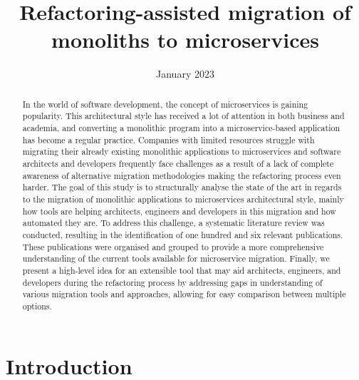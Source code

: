 \documentclass[conference]{IEEEtran}
\title{Refactoring-assisted migration of monoliths to microservices}
\author{
  \IEEEauthorblockN{Breno Salles}
  \IEEEauthorblockA{
    \textit{Faculty of Engineering} \\
    \textit{University of Porto}\\
    Porto, Portugal \\
    up202103389@fe.up.pt
  }
}
\date{January 2023}
\begin{document}
\maketitle

\begin{abstract}


 In the world of software development, the concept of microservices is gaining
 popularity. This architectural style has received a lot of attention in both
 business and academia, and converting a monolithic program into a
 microservice-based application has become a regular practice. Companies with
 limited resources struggle with migrating their already existing monolithic
 applications to microservices and software architects and developers
 frequently face challenges as a result of a lack of complete awareness of
 alternative migration methodologies making the refactoring process even
 harder. The goal of this study is to structurally analyse the state of the
 art in regards to the migration of monolithic applications to microservices
 architectural style, mainly how tools are helping architects, engineers and
 developers in this migration and how automated they are. To address this
 challenge, a systematic literature review was conducted, resulting in the
 identification of one hundred and six relevant publications. These
 publications were organised and grouped to provide a more comprehensive
 understanding of the current tools available for microservice migration.
 Finally, we present a high-level idea for an extensible tool that may aid
 architects, engineers, and developers during the refactoring process by
 addressing gaps in understanding of various migration tools and approaches,
 allowing for easy comparison between multiple options.

\end{abstract}

\section{Introduction} \label{sec:introduction}
\end{document}
